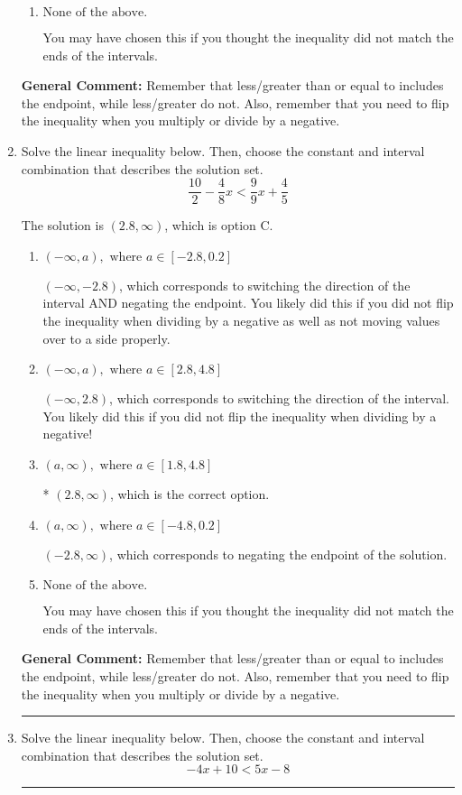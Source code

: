 \documentclass{extbook}[14pt]
\newcommand{\litem}[1]{\item #1

\rule{\textwidth}{0.4pt}}
\begin{document}
\begin{enumerate}
{\begin{enumerate}[label=\Alph*.]
 $(-2.25, \infty)$, which corresponds to negating the endpoint of the solution.
\item \( \text{None of the above}. \)

You may have chosen this if you thought the inequality did not match the ends of the intervals.
\end{enumerate}

\textbf{General Comment:} Remember that less/greater than or equal to includes the endpoint, while less/greater do not. Also, remember that you need to flip the inequality when you multiply or divide by a negative.
}
\litem{
Solve the linear inequality below. Then, choose the constant and interval combination that describes the solution set.
\[ \frac{10}{2} - \frac{4}{8} x < \frac{9}{9} x + \frac{4}{5} \]

The solution is \( (2.8, \infty) \), which is option C.\begin{enumerate}[label=\Alph*.]
\item \( (-\infty, a), \text{ where } a \in [-2.8, 0.2] \)

 $(-\infty, -2.8)$, which corresponds to switching the direction of the interval AND negating the endpoint. You likely did this if you did not flip the inequality when dividing by a negative as well as not moving values over to a side properly.
\item \( (-\infty, a), \text{ where } a \in [2.8, 4.8] \)

 $(-\infty, 2.8)$, which corresponds to switching the direction of the interval. You likely did this if you did not flip the inequality when dividing by a negative!
\item \( (a, \infty), \text{ where } a \in [1.8, 4.8] \)

* $(2.8, \infty)$, which is the correct option.
\item \( (a, \infty), \text{ where } a \in [-4.8, 0.2] \)

 $(-2.8, \infty)$, which corresponds to negating the endpoint of the solution.
\item \( \text{None of the above}. \)

You may have chosen this if you thought the inequality did not match the ends of the intervals.
\end{enumerate}

\textbf{General Comment:} Remember that less/greater than or equal to includes the endpoint, while less/greater do not. Also, remember that you need to flip the inequality when you multiply or divide by a negative.
}
\litem{
Solve the linear inequality below. Then, choose the constant and interval combination that describes the solution set.
\[ -4x + 10 < 5x -8 \]

}
\end{enumerate}
\end{document}
